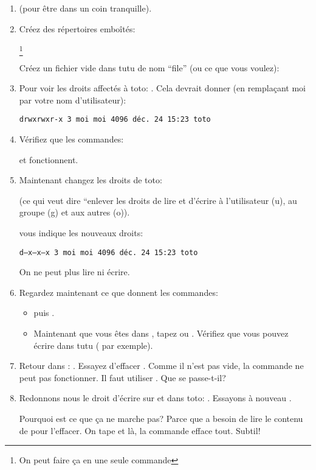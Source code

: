 \exo{}
  \begin{enumerate}
  \item {} (pour être dans un coin tranquille).
  \item Créez des répertoires emboîtés:


    \footnote{On peut faire ça en une seule
      commande }

    Créez un fichier vide dans tutu de nom ``file'' (ou ce que vous
    voulez):

  \item Pour voir les droits affectés à toto: . Cela
    devrait donner (en remplaçant moi par votre nom d'utilisateur):
    
    \texttt{drwxrwxr-x 3 moi moi 4096 déc.  24 15:23 toto}
  \item Vérifiez que les commandes:

     et  fonctionnent.
  \item Maintenant changez les droits de toto:


    (ce qui veut dire ``enlever les
    droits de lire et d'écrire à l'utilisateur (u), au groupe (g) et
    aux autres (o)).

     vous indique les nouveaux droits:

    \texttt{d---x---x---x 3 moi moi 4096 déc.  24 15:23 toto}

    On ne peut plus lire ni écrire.
  \item Regardez maintenant ce que donnent les commandes:
    \begin{itemize}
    \item     {} puis .
    \item Maintenant que vous êtes dans , tapez   ou . Vérifiez que vous pouvez
      écrire dans tutu
    ( par exemple).
    \end{itemize}
  \item Retour dans : . Essayez d'effacer
    . Comme 
    il n'est pas vide, la commande  ne peut pas
    fonctionner. Il faut utiliser . Que se passe-t-il?
    
  \item Redonnons nous le droit d'écrire sur et dans toto:
    .
    Essayons à nouveau .

    Pourquoi est ce que ça
    ne marche pas? Parce que  a besoin de lire le contenu
    de  pour l'effacer. On tape  et là, la
      commande  efface tout. Subtil!
    
    
\end{enumerate}


